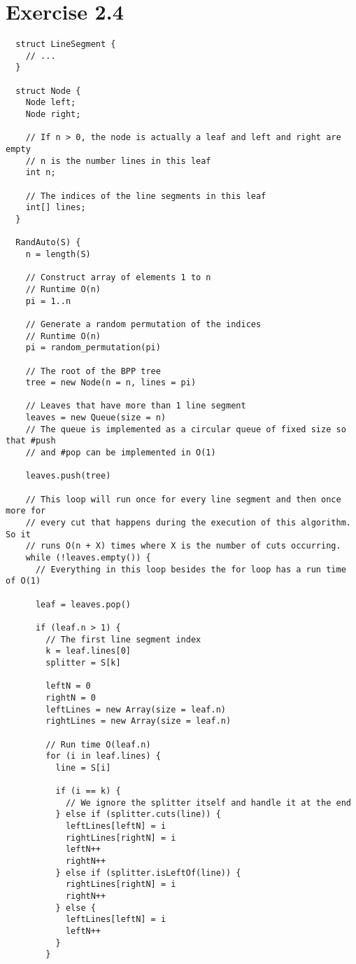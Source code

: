 \documentclass[10pt,a4paper]{article}
\begin{document}
\section*{Exercise 2.4}

\begin{verbatim}
  struct LineSegment {
    // ...
  }

  struct Node {
    Node left;
    Node right;

    // If n > 0, the node is actually a leaf and left and right are empty
    // n is the number lines in this leaf
    int n;

    // The indices of the line segments in this leaf
    int[] lines;
  }

  RandAuto(S) {
    n = length(S)

    // Construct array of elements 1 to n
    // Runtime O(n)
    pi = 1..n

    // Generate a random permutation of the indices
    // Runtime O(n)
    pi = random_permutation(pi)

    // The root of the BPP tree
    tree = new Node(n = n, lines = pi)

    // Leaves that have more than 1 line segment
    leaves = new Queue(size = n)
    // The queue is implemented as a circular queue of fixed size so that #push
    // and #pop can be implemented in O(1)

    leaves.push(tree)

    // This loop will run once for every line segment and then once more for
    // every cut that happens during the execution of this algorithm. So it
    // runs O(n + X) times where X is the number of cuts occurring.
    while (!leaves.empty()) {
      // Everything in this loop besides the for loop has a run time of O(1)

      leaf = leaves.pop()

      if (leaf.n > 1) {
        // The first line segment index
        k = leaf.lines[0]
        splitter = S[k]

        leftN = 0
        rightN = 0
        leftLines = new Array(size = leaf.n)
        rightLines = new Array(size = leaf.n)

        // Run time O(leaf.n)
        for (i in leaf.lines) {
          line = S[i]

          if (i == k) {
            // We ignore the splitter itself and handle it at the end
          } else if (splitter.cuts(line)) {
            leftLines[leftN] = i
            rightLines[rightN] = i
            leftN++
            rightN++
          } else if (splitter.isLeftOf(line)) {
            rightLines[rightN] = i
            rightN++
          } else {
            leftLines[leftN] = i
            leftN++
          }
        }


\end{verbatim}
\end{document}
